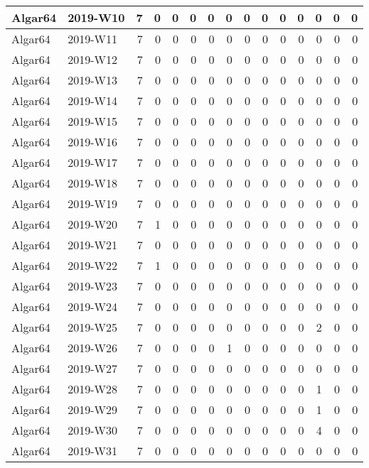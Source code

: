 \documentclass[]{book}
\begin{document}
\begin{table}
\begin{tabular}[t]{l|l|r|r|r|r|r|r|r|r|r|r|r|r|r}
\hline
Algar64 & 2019-W10 & 7 & 0 & 0 & 0 & 0 & 0 & 0 & 0 & 0 & 0 & 0 & 0 & 0\\
\hline
Algar64 & 2019-W11 & 7 & 0 & 0 & 0 & 0 & 0 & 0 & 0 & 0 & 0 & 0 & 0 & 0\\
\hline
Algar64 & 2019-W12 & 7 & 0 & 0 & 0 & 0 & 0 & 0 & 0 & 0 & 0 & 0 & 0 & 0\\
\hline
Algar64 & 2019-W13 & 7 & 0 & 0 & 0 & 0 & 0 & 0 & 0 & 0 & 0 & 0 & 0 & 0\\
\hline
Algar64 & 2019-W14 & 7 & 0 & 0 & 0 & 0 & 0 & 0 & 0 & 0 & 0 & 0 & 0 & 0\\
\hline
Algar64 & 2019-W15 & 7 & 0 & 0 & 0 & 0 & 0 & 0 & 0 & 0 & 0 & 0 & 0 & 0\\
\hline
Algar64 & 2019-W16 & 7 & 0 & 0 & 0 & 0 & 0 & 0 & 0 & 0 & 0 & 0 & 0 & 0\\
\hline
Algar64 & 2019-W17 & 7 & 0 & 0 & 0 & 0 & 0 & 0 & 0 & 0 & 0 & 0 & 0 & 0\\
\hline
Algar64 & 2019-W18 & 7 & 0 & 0 & 0 & 0 & 0 & 0 & 0 & 0 & 0 & 0 & 0 & 0\\
\hline
Algar64 & 2019-W19 & 7 & 0 & 0 & 0 & 0 & 0 & 0 & 0 & 0 & 0 & 0 & 0 & 0\\
\hline
Algar64 & 2019-W20 & 7 & 1 & 0 & 0 & 0 & 0 & 0 & 0 & 0 & 0 & 0 & 0 & 0\\
\hline
Algar64 & 2019-W21 & 7 & 0 & 0 & 0 & 0 & 0 & 0 & 0 & 0 & 0 & 0 & 0 & 0\\
\hline
Algar64 & 2019-W22 & 7 & 1 & 0 & 0 & 0 & 0 & 0 & 0 & 0 & 0 & 0 & 0 & 0\\
\hline
Algar64 & 2019-W23 & 7 & 0 & 0 & 0 & 0 & 0 & 0 & 0 & 0 & 0 & 0 & 0 & 0\\
\hline
Algar64 & 2019-W24 & 7 & 0 & 0 & 0 & 0 & 0 & 0 & 0 & 0 & 0 & 0 & 0 & 0\\
\hline
Algar64 & 2019-W25 & 7 & 0 & 0 & 0 & 0 & 0 & 0 & 0 & 0 & 0 & 2 & 0 & 0\\
\hline
Algar64 & 2019-W26 & 7 & 0 & 0 & 0 & 0 & 1 & 0 & 0 & 0 & 0 & 0 & 0 & 0\\
\hline
Algar64 & 2019-W27 & 7 & 0 & 0 & 0 & 0 & 0 & 0 & 0 & 0 & 0 & 0 & 0 & 0\\
\hline
Algar64 & 2019-W28 & 7 & 0 & 0 & 0 & 0 & 0 & 0 & 0 & 0 & 0 & 1 & 0 & 0\\
\hline
Algar64 & 2019-W29 & 7 & 0 & 0 & 0 & 0 & 0 & 0 & 0 & 0 & 0 & 1 & 0 & 0\\
\hline
Algar64 & 2019-W30 & 7 & 0 & 0 & 0 & 0 & 0 & 0 & 0 & 0 & 0 & 4 & 0 & 0\\
\hline
Algar64 & 2019-W31 & 7 & 0 & 0 & 0 & 0 & 0 & 0 & 0 & 0 & 0 & 0 & 0 & 0\\

\end{tabular}
\end{table}
\end{document}
